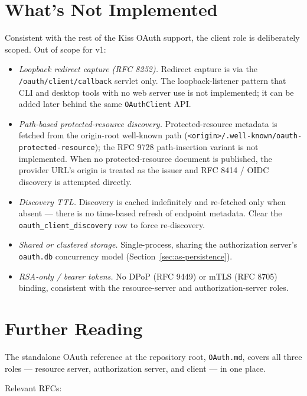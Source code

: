 \section{What's Not Implemented}
\label{sec:oc-omissions}

Consistent with the rest of the Kiss OAuth support, the client role is deliberately scoped.  Out of scope for v1:

\begin{itemize}
  \item \emph{Loopback redirect capture (RFC 8252).}  Redirect capture is via the \texttt{/oauth/client/callback} servlet only.  The loopback-listener pattern that CLI and desktop tools with no web server use is not implemented; it can be added later behind the same \texttt{OAuthClient} API.
  \item \emph{Path-based protected-resource discovery.}  Protected-resource metadata is fetched from the origin-root well-known path (\texttt{<origin>/.well-known/oauth-protected-resource}); the RFC 9728 path-insertion variant is not implemented.  When no protected-resource document is published, the provider URL's origin is treated as the issuer and RFC 8414 / OIDC discovery is attempted directly.
  \item \emph{Discovery TTL.}  Discovery is cached indefinitely and re-fetched only when absent --- there is no time-based refresh of endpoint metadata.  Clear the \texttt{oauth\_client\_discovery} row to force re-discovery.
  \item \emph{Shared or clustered storage.}  Single-process, sharing the authorization server's \texttt{oauth.db} concurrency model (Section~\ref{sec:as-persistence}).
  \item \emph{RSA-only / bearer tokens.}  No DPoP (RFC 9449) or mTLS (RFC 8705) binding, consistent with the resource-server and authorization-server roles.
\end{itemize}

\section{Further Reading}
\label{sec:oc-references}

The standalone OAuth reference at the repository root, \texttt{OAuth.md}, covers all three roles --- resource server, authorization server, and client --- in one place.

Relevant RFCs:

